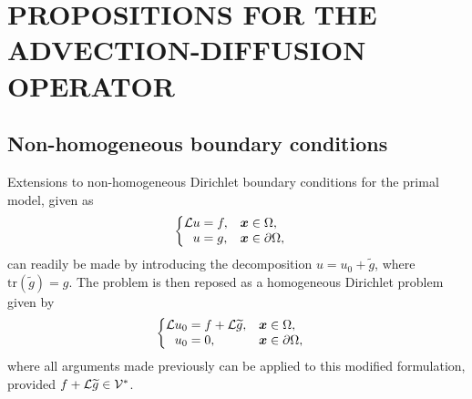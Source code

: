 \chapter{PROPOSITIONS FOR THE ADVECTION-DIFFUSION OPERATOR}
\label{chap:vmsapp}

\section{Non-homogeneous boundary conditions}
\label{app:bcs}

Extensions to non-homogeneous Dirichlet boundary conditions
for the primal model, given as
%
\begin{gather}
\begin{cases}
\begin{aligned}
\mathcal{L} u &= f, & & \boldsymbol{x} \in \Omega, \\
u &= g, & & \boldsymbol{x} \in \partial \Omega,
\end{aligned}
\end{cases}
\label{eq:bcs_primal_pde}
\end{gather}
%
can readily be made by introducing the decomposition
$u = u_0 + \tilde{g}$, where $\text{tr}({\tilde{g}}) = g$.
The problem is then reposed as a homogeneous
Dirichlet problem given by
%
\begin{gather}
\begin{cases}
\begin{aligned}
\mathcal{L} u_0 &= f + \mathcal{L} \widetilde{g}, & & \boldsymbol{x} \in \Omega, \\
u_0 &= 0, & & \boldsymbol{x} \in \partial \Omega,
\end{aligned}
\end{cases}
\end{gather}
%
where all arguments made previously can be applied to this
modified formulation, provided $f + \mathcal{L} \widetilde{g} \in \mathcal{V}^*$.

